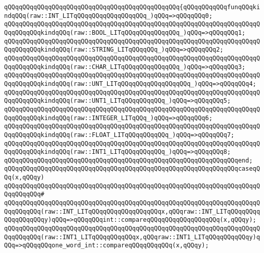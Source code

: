 \verb|qQQqqQQqqQQqqQQqqQQqqQQqqQQqqQQqqQQqqQQqqQQqqQQq{qQQqqQQqqQQqfunqQQqkindqQQq(raw::INT_LITqQQqqQQqqQQqqQQqqQQq_)qQQq=>qQQqqQQq0;|\newline
\verb|qQQqqQQqqQQqqQQqqQQqqQQqqQQqqQQqqQQqqQQqqQQqqQQqqQQqqQQqqQQqqQQqqQQqqQQqqQQqqQQqkindqQQq(raw::BOOL_LITqQQqqQQqqQQqqQQq_)qQQq=>qQQqqQQq1;|\newline
\verb|qQQqqQQqqQQqqQQqqQQqqQQqqQQqqQQqqQQqqQQqqQQqqQQqqQQqqQQqqQQqqQQqqQQqqQQqqQQqqQQqkindqQQq(raw::STRING_LITqQQqqQQq_)qQQq=>qQQqqQQq2;|\newline
\verb|qQQqqQQqqQQqqQQqqQQqqQQqqQQqqQQqqQQqqQQqqQQqqQQqqQQqqQQqqQQqqQQqqQQqqQQqqQQqqQQqkindqQQq(raw::CHAR_LITqQQqqQQqqQQqqQQq_)qQQq=>qQQqqQQq3;|\newline
\verb|qQQqqQQqqQQqqQQqqQQqqQQqqQQqqQQqqQQqqQQqqQQqqQQqqQQqqQQqqQQqqQQqqQQqqQQqqQQqqQQqkindqQQq(raw::UNT_LITqQQqqQQqqQQqqQQqqQQq_)qQQq=>qQQqqQQq4;|\newline
\verb|qQQqqQQqqQQqqQQqqQQqqQQqqQQqqQQqqQQqqQQqqQQqqQQqqQQqqQQqqQQqqQQqqQQqqQQqqQQqqQQqkindqQQq(raw::UNT1_LITqQQqqQQqqQQq_)qQQq=>qQQqqQQq5;|\newline
\verb|qQQqqQQqqQQqqQQqqQQqqQQqqQQqqQQqqQQqqQQqqQQqqQQqqQQqqQQqqQQqqQQqqQQqqQQqqQQqqQQqkindqQQq(raw::INTEGER_LITqQQq_)qQQq=>qQQqqQQq6;|\newline
\verb|qQQqqQQqqQQqqQQqqQQqqQQqqQQqqQQqqQQqqQQqqQQqqQQqqQQqqQQqqQQqqQQqqQQqqQQqqQQqqQQqkindqQQq(raw::FLOAT_LITqQQqqQQqqQQq_)qQQq=>qQQqqQQq7;|\newline
\verb|qQQqqQQqqQQqqQQqqQQqqQQqqQQqqQQqqQQqqQQqqQQqqQQqqQQqqQQqqQQqqQQqqQQqqQQqqQQqqQQqkindqQQq(raw::INT1_LITqQQqqQQqqQQq_)qQQq=>qQQqqQQq8;|\newline
\verb|qQQqqQQqqQQqqQQqqQQqqQQqqQQqqQQqqQQqqQQqqQQqqQQqqQQqqQQqqQQqqQQqend;|\newline
\newline
\verb|qQQqqQQqqQQqqQQqqQQqqQQqqQQqqQQqqQQqqQQqqQQqqQQqqQQqqQQqqQQqqQQqcaseqQQq(x,qQQqy)|\newline
\verb|qQQqqQQqqQQqqQQqqQQqqQQqqQQqqQQqqQQqqQQqqQQqqQQqqQQqqQQqqQQqqQQqqQQqqQQqqQQqqQQq#|\newline
\verb|qQQqqQQqqQQqqQQqqQQqqQQqqQQqqQQqqQQqqQQqqQQqqQQqqQQqqQQqqQQqqQQqqQQqqQQqqQQqqQQq(raw::INT_LITqQQqqQQqqQQqqQQqqQQqx,qQQqraw::INT_LITqQQqqQQqqQQqqQQqqQQqy)qQQq=>qQQqqQQqint::compareqQQqqQQqqQQqqQQqqQQq(x,qQQqy);|\newline
\verb|qQQqqQQqqQQqqQQqqQQqqQQqqQQqqQQqqQQqqQQqqQQqqQQqqQQqqQQqqQQqqQQqqQQqqQQqqQQqqQQq(raw::INT1_LITqQQqqQQqqQQqx,qQQqraw::INT1_LITqQQqqQQqqQQqy)qQQq=>qQQqqQQqone_word_int::compareqQQqqQQqqQQq(x,qQQqy);|\newline

